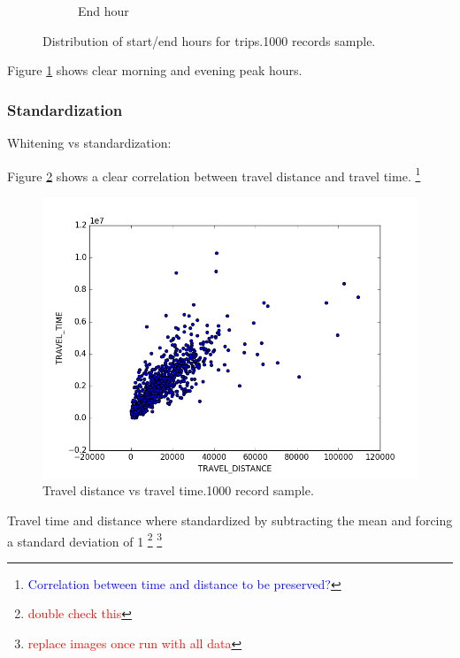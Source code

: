 \documentclass{article}
\newcommand{\selfnote}[1]{\footnote{\textcolor{red}{#1}}}
\newcommand{\technicalDoubt}[1]{\footnote{\textcolor{blue}{#1}}}
\begin{document}
\begin{figure}[H]
\begin{subfigure}[b]{.45\textwidth}
  	\caption{End hour}
  \end{subfigure}
  \caption{Distribution of start/end hours for trips.1000 records sample.}
  	\label{fig:preprocessing/start_end_hour}
\end{figure}

Figure \ref{fig:preprocessing/start_end_hour} shows clear morning and evening peak hours. 

\subsubsection{Standardization}
Whitening vs standardization: 

Figure \ref{fig:preprocessing/distance_time_correlation} shows a clear correlation between travel distance and travel time. \technicalDoubt{Correlation between time and distance to be preserved?}

\begin{figure}
  \centering
  \includegraphics[width=.8\linewidth]{./images/distance_vs_time.png}
  \caption{Travel distance vs travel time.1000 record sample.}
  \label{fig:preprocessing/distance_time_correlation}
\end{figure}

Travel time and distance where standardized by subtracting the mean and forcing a standard deviation of 1 \selfnote{double check this} \selfnote{replace images once run with all data}
\end{document}
